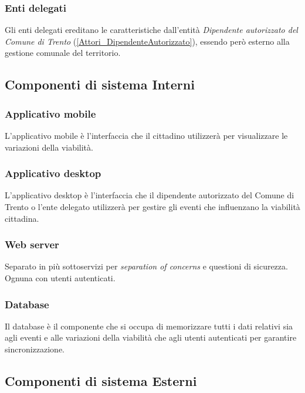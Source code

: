 \documentclass{article}
\begin{document}
\subsubsection{Enti delegati}
\label{3.2.1}
Gli enti delegati ereditano le caratteristiche dall'entità \textit{Dipendente autorizzato del Comune di Trento} (\ref{Attori_DipendenteAutorizzato}), essendo però esterno alla gestione comunale del territorio.

\subsection{Componenti di sistema Interni}

\subsubsection{Applicativo mobile}
\label{3.3.1}
L'applicativo mobile è l'interfaccia che il cittadino utilizzerà per visualizzare le variazioni della viabilità.\\

\subsubsection{Applicativo desktop}
\label{3.3.2}
L'applicativo desktop è l'interfaccia che il dipendente autorizzato del Comune di Trento o l'ente delegato utilizzerà per gestire gli eventi che influenzano la viabilità cittadina.\\

\subsubsection{Web server}
\label{3.3.3}
Separato in più sottoservizi per \textit{separation of concerns} e questioni di sicurezza.\\
Ognuna con utenti autenticati.

\subsubsection{Database}
\label{3.3.4}
Il database è il componente che si occupa di memorizzare tutti i dati relativi sia agli eventi e alle variazioni della viabilità che agli utenti autenticati per garantire sincronizzazione.

\subsection{Componenti di sistema Esterni}
\end{document}
